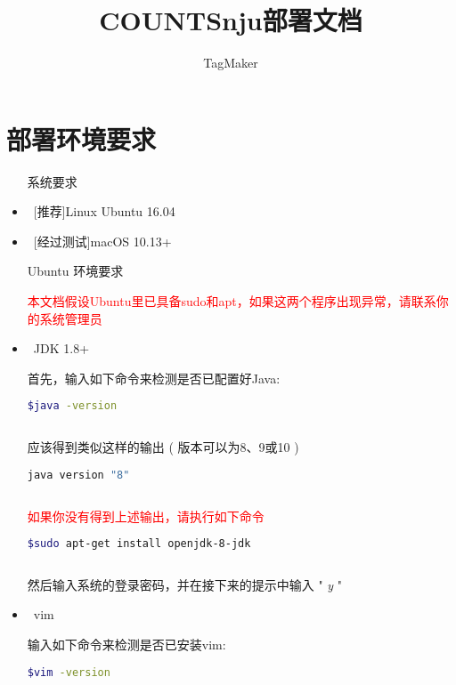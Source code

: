 \documentclass{ctexart}
\author{TagMaker}
\title{COUNTSnju部署文档}
\begin{document}
\maketitle
\newpage
\tableofcontents
\newpage
\section{部署环境要求}
\begin{itemize}
        \item [系统要求]
        \
        

        \item\  [推荐]Linux Ubuntu 16.04

        \item\  [经过测试]macOS 10.13+

        \item[Ubuntu 环境要求]
        \

        \textcolor{red}{本文档假设Ubuntu里已具备sudo和apt，如果这两个程序出现异常，请联系你的系统管理员}
        
        \item\ JDK 1.8+

        首先，输入如下命令来检测是否已配置好Java:

        \begin{lstlisting}[language=bash]
         $java -version
                
        \end{lstlisting}

        应该得到类似这样的输出 ( 版本可以为8、9或10 )

        \begin{lstlisting}[language=bash]
         java version "8"
                
        \end{lstlisting}
        \textcolor{red}{如果你没有得到上述输出，请执行如下命令}
        \begin{lstlisting}[language=bash]
         $sudo apt-get install openjdk-8-jdk
                       
        \end{lstlisting}
        然后输入系统的登录密码，并在接下来的提示中输入 " \emph{y} "

        \item\ vim

        输入如下命令来检测是否已安装vim:

        \begin{lstlisting}[language=bash]
         $vim -version
                

\end{lstlisting}
\end{itemize}
\end{document}
